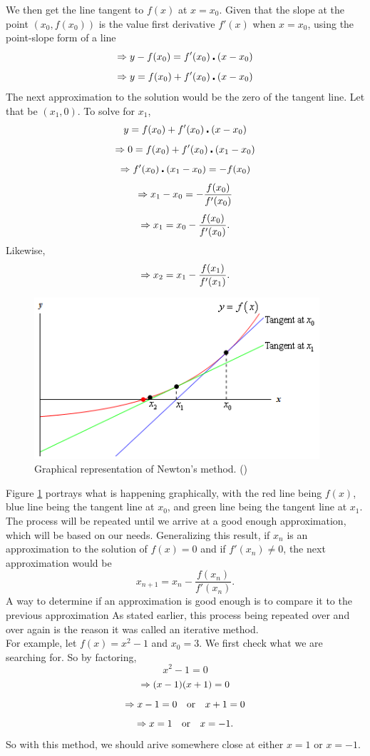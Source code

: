We then get the line tangent to $f(x)$ at $x = x_0$. Given that the slope at the point $(x_0,f(x_0))$ is the value first derivative $f'(x)$ when $x=x_0$, using the point-slope form of a line
$$\Rightarrow y - f(x_0) = f'(x_0)\centerdot(x-x_0)$$
$$\Rightarrow y = f(x_0) + f'(x_0)\centerdot(x-x_0)$$
The next approximation to the solution would be the zero of the tangent line. Let that be $(x_1,0)$. To solve for $x_1$,
$$y = f(x_0) + f'(x_0)\centerdot(x-x_0)$$
$$\Rightarrow 0 = f(x_0) + f'(x_0)\centerdot(x_1-x_0)$$
$$\Rightarrow f'(x_0)\centerdot(x_1-x_0) = -f(x_0)$$
$$\Rightarrow x_1-x_0 = -\frac{f(x_0)}{f'(x_0)}$$
$$\Rightarrow x_1 = x_0 -\frac{f(x_0)}{f'(x_0)}.$$
Likewise,
$$\Rightarrow x_2 = x_1 -\frac{f(x_1)}{f'(x_1)}.$$
\begin{figure}[h]
	\center
	\includegraphics[width = 300pt]{NMGraphics}
	\caption{Graphical representation of Newton's method. (\cite{PaulNM})}
	\label{figureNM}
\end{figure}
Figure \ref{figureNM} portrays what is happening graphically, with the red line being $f(x)$, blue line being the tangent line at $x_0$, and green line being the tangent line at $x_1$. The process will be repeated until we arrive at a good enough approximation, which will be based on our needs. Generalizing this result, if $x_n$ is an approximation to the solution of $f(x) = 0$ and if $f'(x_n)\neq0$, the next approximation would be
$$x_{n+1} = x_n -\frac{f(x_n)}{f'(x_n)}.$$
A way to determine if an approximation is good enough is to compare it to the previous approximation As stated earlier, this process being repeated over and over again is the reason it was called an iterative method.
\\

For example, let $f(x) = x^2 - 1$ and $x_0 = 3$. We first check what we are searching for. So by factoring,
$$x^2 - 1 = 0$$
$$\Rightarrow (x - 1)(x + 1) = 0$$
$$\Rightarrow x - 1 = 0 \quad \textrm{or} \quad x + 1 = 0$$
$$\Rightarrow x = 1 \quad \textrm{or} \quad x = -1.$$
So with this method, we should arive somewhere close at either $x=1$ or $x=-1$.
\\

